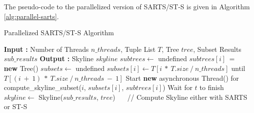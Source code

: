 The pseudo-code to the parallelized version of SARTS/ST-S is given in Algorithm \ref{alg:parallel-sarts}. 
\begin{algorithm}[h]
	\caption{Parallelized SARTS/ST-S Algorithm} \label{alg:parallel-sarts}
	\begin{algorithmic}[1]		
		\State \textbf{Input :} Number of Threads $n\_threads$, Tuple List $T$, Tree $tree$, Subset Results $sub\_results$
		\State \textbf{Output :} Skyline $skyline$
		\State $subtrees \gets$ undefined
			\State $subtrees[i]~=$ \textbf{new} Tree()
		\EndFor
		\State $subsets \gets$ undefined
			\State $subsets[i] \gets T[i~*~T.size~/~n\_threads]$ until $T[(i~+~1)~*~T.size~/~n\_threads~-~1]$
			\State Start \textbf{new} asynchronous Thread() for compute\_skyline\_subset($i$, $subsets[i]$, $subtrees[i]$)
		\EndFor	
			\State Wait for $t$ to finish
		\EndFor		
		\State $skyline \gets$ Skyline($sub\_results$, $tree$) $~~~~~$ {\footnotesize // Compute Skyline either with SARTS or ST-S}
		
		
	\end{algorithmic}
\end{algorithm}
